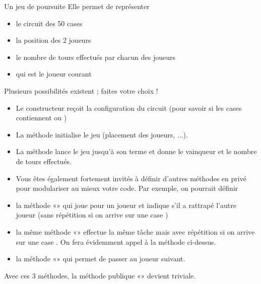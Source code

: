 \begin{Exercice}{Un jeu de poursuite}
	Elle permet de représenter
	\liststyleListi
	\begin{itemize}
		\item 
			le circuit des 50 cases
		\item 
			la position des 2 joueurs
		\item 
			le nombre de tours effectués par chacun des joueurs
		\item 
			qui est le joueur courant
	\end{itemize}
	Plusieurs possibilités existent ; faites votre choix !
	\begin{itemize}
		\item 
			Le constructeur reçoit la configuration du circuit (pour savoir si les
			cases contiennent  ou
			)
		\item 
			La méthode  initialise le jeu
			(placement des joueurs, ...).
		\item 
			La méthode  lance le jeu jusqu’à son terme et
			donne le vainqueur et le nombre de tours effectués.
		\item 
			Vous êtes également fortement invités à définir d’autres méthodes en
			privé pour modulariser au mieux votre code. Par exemple, on pourrait
			définir
		\item 
			la méthode «» qui joue pour un joueur et
			indique s'il a rattrapé l’autre joueur (sans
			répétition si on arrive sur une case )
		\item 
			la même méthode «» effectue la même tâche
			mais avec répétition si on arrive sur une case
			. On fera évidemment appel à la méthode
			ci-dessus.
		\item 
			la méthode «» qui permet de passer au
			joueur suivant.
	\end{itemize}
	
	Avec ces 3 méthodes, la méthode publique
	«» devient triviale.
\end{Exercice}

